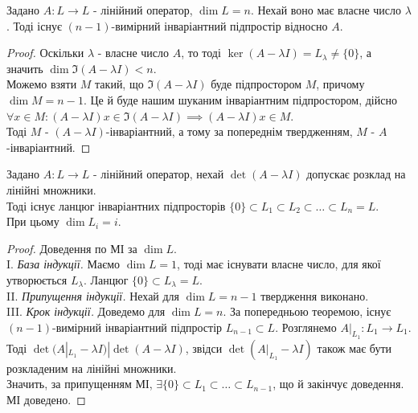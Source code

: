 \documentclass{math_library}
\begin{document}
\iffalse
\begin{theorem}
Задано $A: L \to L$ - лінійний оператор, $\dim L = n$. Нехай воно має власне число $\lambda$. Тоді існує $(n-1)$-вимірний інваріантний підпростір відносно $A$.
\end{theorem}

\begin{proof}
Оскільки $\lambda$ - власне число $A$, то тоді $\ker (A-\lambda I) = L_{\lambda} \neq \{0\}$, а значить $\dim \Im (A-\lambda I) < n$.\\
Можемо взяти $M$ такий, що $\Im (A-\lambda I)$ буде підпростором $M$, причому $\dim M = n-1$. Це й буде нашим шуканим інваріантним підпростором, дійсно\\
$\forall x \in M: (A-\lambda I)x \in \Im (A-\lambda I) \implies (A-\lambda I)x \in M$.\\
Тоді $M$ - $(A-\lambda I)$-інваріантний, а тому за попереднім твердженням, $M$ - $A$-інваріантний.
\end{proof}

\begin{theorem}
Задано $A: L \to L$ - лінійний оператор, нехай $\det (A-\lambda I)$ допускає розклад на лінійні множники.\\
Тоді існує ланцюг інваріантних підпросторів $\{0\} \subset L_1 \subset L_2 \subset \dots \subset L_n = L$.\\
При цьому $\dim L_i = i$.
\end{theorem}

\begin{proof}
Доведення по МІ за $\dim L$.\\
I. \textit{База індукції.} Маємо $\dim L = 1$, тоді має існувати власне число, для якої утворюється $L_{\lambda}$. Ланцюг $\{0\} \subset L_{\lambda} = L$.\\
II. \textit{Припущення індукції.} Нехай для $\dim L = n-1$ твердження виконано.\\
III. \textit{Крок індукції.} Доведемо для $\dim L = n$. За попередньою теоремою, існує $(n-1)$-вимірний інваріантний підпростір $L_{n-1} \subset L$. Розглянемо $A|_{L_1}: L_1 \to L_1$. Тоді $\det (A|_{L_1}-\lambda I) | \det(A-\lambda I)$, звідси $\det (A|_{L_1}-\lambda I)$ також має бути розкладеним на лінійні множники.\\
Значить, за припущенням МІ, $\exists \{0\} \subset L_1 \subset \dots \subset L_{n-1}$, що й закінчує доведення.\\
МІ доведено.
\end{proof}
\end{document}
